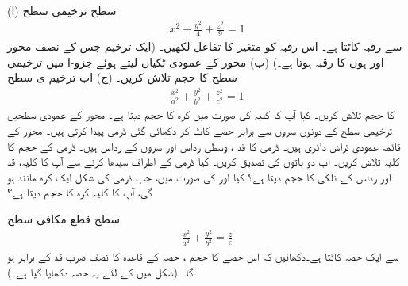 \\
(ا)  سطح   ترخیمی سطح
 \begin{align*}
x^2+\tfrac{y^2}{4}+\tfrac{z^2}{9}=1
\end{align*}
 سے رقبہ  کاٹتا ہے۔ اس رقبہ کو متغیر  کا تفاعل لکھیں۔ (ایک ترخیم جس کے نصف محور  اور  ہوں کا رقبہ  ہوتا ہے۔)     (ب) محور  کے عمودی  ٹکیاں  لیتے ہوئے  جزو-ا میں ترخیمی سطح کا حجم تلاش کریں۔ (ج) اب ترخیم ی سطح 
\begin{align*}
\tfrac{x^2}{a^2}+\tfrac{y^2}{b^2}+\tfrac{z^2}{c^2}=1
\end{align*}
 کا حجم تلاش کریں۔ کیا آپ کا کلیہ  کی صورت میں کرہ کا حجم دیتا ہے۔ 
محور  کے عمودی سطحیں   ترخیمی  سطح کے دونوں سروں سے   برابر حصے کاٹ کر دکھائی  گئی  ڈرمی    پیدا کرتی ہیں۔ محور  کے قائمہ عمودی تراش دائری ہیں۔  ڈرمی  کا قد ،  وسطی رداس  اور سروں کے رداس  ہیں۔ ڈرمی کے حجم کا کلیہ تلاش کریں۔ اب دو باتوں  کی تصدیق کریں۔  کیا  ڈرمی کے اطراف سیدھا کرنے سے آپ کا کلیہ، قد  اور رداس  کے  نلکی کا حجم دیتا ہے؟  کیا  اور   کی صورت میں، جب   ڈرمی    کی شکل ایک کرہ مانند ہو گی، آپ کا کلیہ کرہ کا حجم دیتا ہے؟
\begin{center}
\end{center}
سطح   قطع مکافی سطح
\begin{align*}
\frac{x^2}{a^2}+\frac{y^2}{b^2}=\frac{z}{c}
\end{align*}
سے ایک حصہ کاٹتا ہے۔دکھائیں کہ اس حصے  کا حجم ،  حصہ کے قاعدہ کا نصف ضرب قد کے برابر ہو گا۔ (شکل  میں  کے لئے یہ حصہ دکھایا گیا ہے۔)
